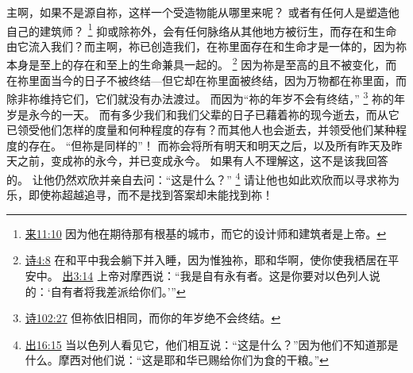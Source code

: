 \documentclass[12pt, a4paper, oneside]{ctexart}
\begin{document}
	主啊，如果不是源自祢，这样一个受造物能从哪里来呢？
	或者有任何人是塑造他自己的建筑师？
    \footnote {
        \href{https://biblehub.com/hebrews/11-10.htm}{来11:10} 因为他在期待那有根基的城市，而它的设计师和建筑者是上帝。
    }
	抑或除祢外，会有任何脉络从其他地方被衍生，而存在和生命由它流入我们？而主啊，祢已创造我们，在祢里面存在和生命才是一体的，因为祢本身是至上的存在和至上的生命兼具一起的。
    \footnote {
        \href{https://biblehub.com/psalms/4-8.htm}{诗4:8} 在和平中我会躺下并入睡，因为惟独祢，耶和华啊，使你使我栖居在平安中。
        \href{https://biblehub.com/exodus/3-14.htm}{出3:14} 上帝对摩西说：“我是自有永有者。这是你要对以色列人说的：‘自有者将我差派给你们。’”
    }
	因为祢是至高的且不被变化，而在祢里面当今的日子不被终结---但它却在祢里面被终结，因为万物都在祢里面，而除非祢维持它们，它们就没有办法渡过。
	而因为“祢的年岁不会有终结，”
    \footnote {
        \href{https://biblehub.com/psalms/102-27.htm}{诗102:27} 但祢依旧相同，而你的年岁绝不会终结。
    }
    祢的年岁是永今的一天。
	而有多少我们和我们父辈的日子已藉着祢的现今逝去，而从它已领受他们怎样的度量和何种程度的存有？而其他人也会逝去，并领受他们某种程度的存在。
	“但祢是同样的”！
	而祢会将所有明天和明天之后，以及所有昨天及昨天之前，变成祢的永今，并已变成永今。
	如果有人不理解这，这不是该我回答的。
	让他仍然欢欣并亲自去问：“这是什么？”
    \footnote {
        \href{https://biblehub.com/exodus/16-15.htm}{出16:15} 当以色列人看见它，他们相互说：“这是什么？”因为他们不知道那是什么。摩西对他们说：“这是耶和华已赐给你们为食的干粮。”
    }
	请让他也如此欢欣而以寻求祢为乐，即使祢超越追寻，而不是找到答案却未能找到祢！
\end{document}
